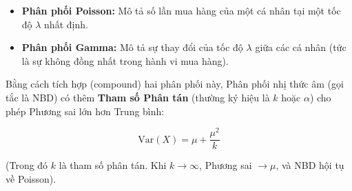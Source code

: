\begin{itemize}
\item \textbf{Phân phối Poisson:} Mô tả số lần mua hàng của một cá nhân tại một tốc độ $\lambda$ nhất định.
\item \textbf{Phân phối Gamma:} Mô tả sự thay đổi của tốc độ $\lambda$ giữa các cá nhân (tức là sự không đồng nhất trong hành vi mua hàng).
\end{itemize}

Bằng cách tích hợp (compound) hai phân phối này, 
Phân phối nhị thức âm (gọi tắc là NBD) 
có thêm \textbf{Tham số Phân tán} 
(thường ký hiệu là $k$ hoặc $\alpha$) 
cho phép Phương sai lớn hơn Trung bình:

$$\mathrm{Var}(X) = \mu + \frac{\mu^2}{k}$$

(Trong đó $k$ là tham số phân tán. Khi $k \to \infty$, Phương sai $\to \mu$, và NBD hội tụ về Poisson).
